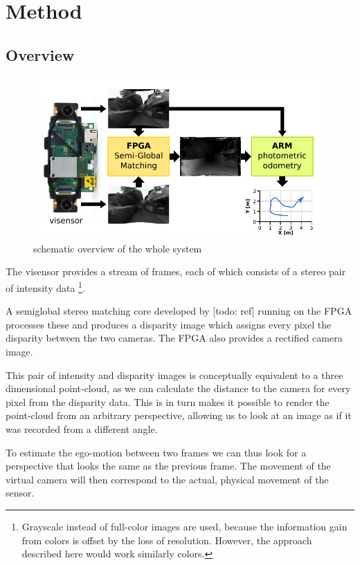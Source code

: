 \chapter{Method}
\label{sec:method}



\section{Overview}

\begin{figure}[h]
    \centering
    \includegraphics[width=\textwidth]{images/system_overview.pdf}
    \caption{schematic overview of the whole system}
    \label{fig:overview}
\end{figure}


The visensor provides a stream of frames, each of which consists of a stereo
pair of intensity data \footnote{Grayscale instead of full-color images are
used, because the information gain from colors is offset by the loss of
resolution. However, the approach described here would work similarly colors.}.

A semiglobal stereo matching core developed by [todo: ref] running on the FPGA
processes these and produces a disparity image which assigns every pixel the
disparity between the two cameras. The FPGA also provides a rectified camera
image.

This pair of intensity and disparity images is conceptually equivalent to a
three dimensional point-cloud, as we can calculate the distance to the camera
for every pixel from the disparity data. This is in turn makes it possible to
render the point-cloud from an arbitrary perspective, allowing us to look at an
image as if it was recorded from a different angle.

To estimate the ego-motion between two frames we can thus look for a
perspective that looks the same as the previous frame.  The movement of the
virtual camera will then correspond to the actual, physical movement of the
sensor.

